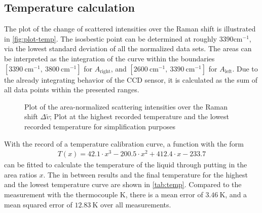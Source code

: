 \subsection*{Temperature calculation}
\label{subsec:temp-eval}

The plot of the change of scattered intensities over the Raman shift is illustrated in \autoref{fig:plot-temp}. The isosbestic point can be determined at roughly $3390 \mathrm{cm^{-1}}$, via the lowest standard deviation of all the normalized data sets. The areas can be interpreted as the integration of the curve within the boundaries $[3390~\mathrm{cm^{-1}},~3800~\mathrm{cm^{-1}}]$ for $A_\mathrm{right}$, and $[2600~\mathrm{cm^{-1}},~3390~\mathrm{cm^{-1}}]$ for $A_\mathrm{left}$. Due to the already integrating behavior of the CCD sensor, it is calculated as the sum of all data points within the presented ranges.

\begin{figure}[!htb]
    \centering
    
    \caption[Area-normalized Raman shift intensities for the lowest and highest temperatures]{Plot of the area-normalized scattering intensities over the Raman shift $\Delta \tilde{v}$; Plot at the highest recorded temperature and the lowest recorded temperature for simplification purposes}
    \label{fig:plot-temp}
\end{figure}

With the record of a temperature calibration curve, a function with the form
\begin{align}
    T(x)=42.1 \cdot x^3 - 200.5 \cdot x^2 + 412.4 \cdot x -233.7
\end{align}
can be fitted to calculate the temperature of the liquid through putting in the area ratios $x$. The in between results and the final temperature for the highest and the lowest temperature curve are shown in \autoref{tab:temp}. Compared to the measurement with the thermocouple K, there is a mean error of $3.46~\mathrm{K}$, and a mean squared error of $12.83~\mathrm{K}$ over all measurements.

